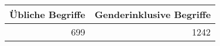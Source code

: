 
\begin{tabular}{rr}
\toprule
Übliche Begriffe & Genderinklusive Begriffe\\
\midrule
699 & 1242\\
\bottomrule
\end{tabular}